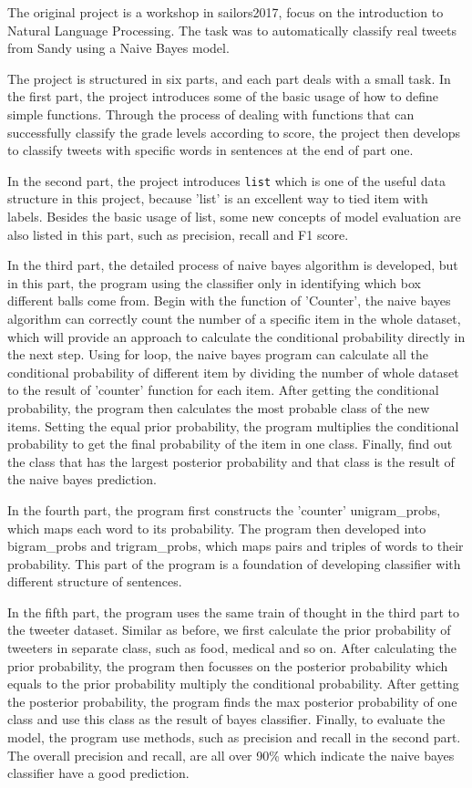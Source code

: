 \documentclass[12pt,a4paper]{report}
\begin{document}
  The original project is a workshop in sailors2017, focus on the
  introduction to Natural Language Processing. The task was to
  automatically classify real tweets from Sandy using a Naive Bayes model.

  The project is structured in six parts, and each part deals with a small
  task. In the first part, the project introduces some of the basic usage
  of how to define simple functions. Through the process of dealing with
  functions that can successfully classify the grade levels according to
  score, the project then develops to classify tweets with specific words
  in sentences at the end of part one.

  In the second part, the project introduces \texttt{list} which is one of
  the useful data structure in this project, because 'list' is an
  excellent way to tied item with labels. Besides the basic usage of list,
  some new concepts of model evaluation are also listed in this part, such
  as precision, recall and F1 score.

  In the third part, the detailed process of naive bayes algorithm is
  developed, but in this part, the program using the classifier only in
  identifying which box different balls come from. Begin with the function
  of 'Counter', the naive bayes algorithm can correctly count the number
  of a specific item in the whole dataset, which will provide an approach
  to calculate the conditional probability directly in the next step.
  Using for loop, the naive bayes program can calculate all the
  conditional probability of different item by dividing the number of
  whole dataset to the result of 'counter' function for each item. After
  getting the conditional probability, the program then calculates the
  most probable class of the new items. Setting the equal prior
  probability, the program multiplies the conditional probability to get
  the final probability of the item in one class. Finally, find out the
  class that has the largest posterior probability and that class is the
  result of the naive bayes prediction.

  In the fourth part, the program first constructs the 'counter'
  unigram\_probs, which maps each word to its probability. The program
  then developed into bigram\_probs and trigram\_probs, which maps pairs
  and triples of words to their probability. This part of the program is a
  foundation of developing classifier with different structure of
  sentences.

  In the fifth part, the program uses the same train of thought in the
  third part to the tweeter dataset. Similar as before, we first calculate
  the prior probability of tweeters in separate class, such as food,
  medical and so on. After calculating the prior probability, the program
  then focusses on the posterior probability which equals to the prior
  probability multiply the conditional probability. After getting the
  posterior probability, the program finds the max posterior probability
  of one class and use this class as the result of bayes classifier.
  Finally, to evaluate the model, the program use methods, such as
  precision and recall in the second part. The overall precision and
  recall, are all over 90\% which indicate the naive bayes classifier have
  a good prediction.
\end{document}
